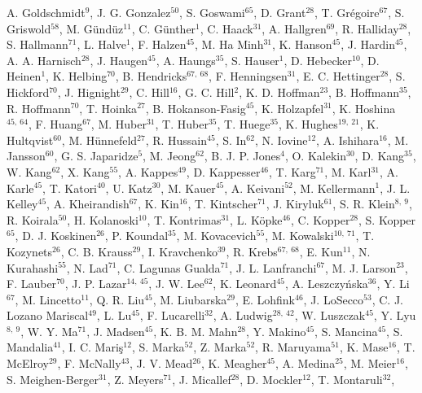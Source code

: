 \documentclass[a4paper,11pt]{article}
\begin{document}
A. Goldschmidt$^{9}$,
J. G. Gonzalez$^{50}$,
S. Goswami$^{65}$,
D. Grant$^{28}$,
T. Gr{\'e}goire$^{67}$,
S. Griswold$^{58}$,
M. G{\"u}nd{\"u}z$^{11}$,
C. G{\"u}nther$^{1}$,
C. Haack$^{31}$,
A. Hallgren$^{69}$,
R. Halliday$^{28}$,
S. Hallmann$^{71}$,
L. Halve$^{1}$,
F. Halzen$^{45}$,
M. Ha Minh$^{31}$,
K. Hanson$^{45}$,
J. Hardin$^{45}$,
A. A. Harnisch$^{28}$,
J. Haugen$^{45}$,
A. Haungs$^{35}$,
S. Hauser$^{1}$,
D. Hebecker$^{10}$,
D. Heinen$^{1}$,
K. Helbing$^{70}$,
B. Hendricks$^{67,\: 68}$,
F. Henningsen$^{31}$,
E. C. Hettinger$^{28}$,
S. Hickford$^{70}$,
J. Hignight$^{29}$,
C. Hill$^{16}$,
G. C. Hill$^{2}$,
K. D. Hoffman$^{23}$,
B. Hoffmann$^{35}$,
R. Hoffmann$^{70}$,
T. Hoinka$^{27}$,
B. Hokanson-Fasig$^{45}$,
K. Holzapfel$^{31}$,
K. Hoshina$^{45,\: 64}$,
F. Huang$^{67}$,
M. Huber$^{31}$,
T. Huber$^{35}$,
T. Huege$^{35}$,
K. Hughes$^{19,\: 21}$,
K. Hultqvist$^{60}$,
M. H{\"u}nnefeld$^{27}$,
R. Hussain$^{45}$,
S. In$^{62}$,
N. Iovine$^{12}$,
A. Ishihara$^{16}$,
M. Jansson$^{60}$,
G. S. Japaridze$^{5}$,
M. Jeong$^{62}$,
B. J. P. Jones$^{4}$,
O. Kalekin$^{30}$,
D. Kang$^{35}$,
W. Kang$^{62}$,
X. Kang$^{55}$,
A. Kappes$^{49}$,
D. Kappesser$^{46}$,
T. Karg$^{71}$,
M. Karl$^{31}$,
A. Karle$^{45}$,
T. Katori$^{40}$,
U. Katz$^{30}$,
M. Kauer$^{45}$,
A. Keivani$^{52}$,
M. Kellermann$^{1}$,
J. L. Kelley$^{45}$,
A. Kheirandish$^{67}$,
K. Kin$^{16}$,
T. Kintscher$^{71}$,
J. Kiryluk$^{61}$,
S. R. Klein$^{8,\: 9}$,
R. Koirala$^{50}$,
H. Kolanoski$^{10}$,
T. Kontrimas$^{31}$,
L. K{\"o}pke$^{46}$,
C. Kopper$^{28}$,
S. Kopper$^{65}$,
D. J. Koskinen$^{26}$,
P. Koundal$^{35}$,
M. Kovacevich$^{55}$,
M. Kowalski$^{10,\: 71}$,
T. Kozynets$^{26}$,
C. B. Krauss$^{29}$,
I. Kravchenko$^{39}$,
R. Krebs$^{67,\: 68}$,
E. Kun$^{11}$,
N. Kurahashi$^{55}$,
N. Lad$^{71}$,
C. Lagunas Gualda$^{71}$,
J. L. Lanfranchi$^{67}$,
M. J. Larson$^{23}$,
F. Lauber$^{70}$,
J. P. Lazar$^{14,\: 45}$,
J. W. Lee$^{62}$,
K. Leonard$^{45}$,
A. Leszczy{\'n}ska$^{36}$,
Y. Li$^{67}$,
M. Lincetto$^{11}$,
Q. R. Liu$^{45}$,
M. Liubarska$^{29}$,
E. Lohfink$^{46}$,
J. LoSecco$^{53}$,
C. J. Lozano Mariscal$^{49}$,
L. Lu$^{45}$,
F. Lucarelli$^{32}$,
A. Ludwig$^{28,\: 42}$,
W. Luszczak$^{45}$,
Y. Lyu$^{8,\: 9}$,
W. Y. Ma$^{71}$,
J. Madsen$^{45}$,
K. B. M. Mahn$^{28}$,
Y. Makino$^{45}$,
S. Mancina$^{45}$,
S. Mandalia$^{41}$,
I. C. Mari{\c{s}}$^{12}$,
S. Marka$^{52}$,
Z. Marka$^{52}$,
R. Maruyama$^{51}$,
K. Mase$^{16}$,
T. McElroy$^{29}$,
F. McNally$^{43}$,
J. V. Mead$^{26}$,
K. Meagher$^{45}$,
A. Medina$^{25}$,
M. Meier$^{16}$,
S. Meighen-Berger$^{31}$,
Z. Meyers$^{71}$,
J. Micallef$^{28}$,
D. Mockler$^{12}$,
T. Montaruli$^{32}$,
\end{document}
